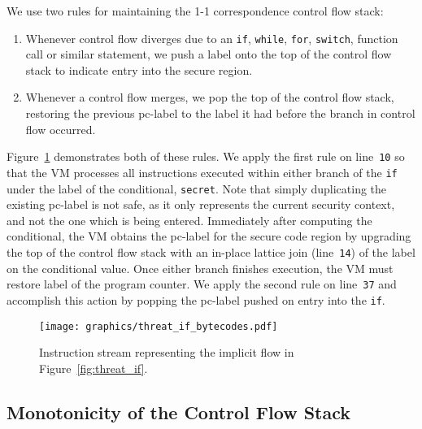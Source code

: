 \documentclass[preprint]{sigplanconf}
\begin{document}
We use two rules for maintaining the 1-1 correspondence control flow stack:
\begin{enumerate}
 \item Whenever control flow diverges due to an \texttt{if}, \texttt{while}, \texttt{for}, \texttt{switch}, function call or similar statement, we push a label onto the top of the control flow stack to indicate entry into the secure region.
 \item Whenever a control flow merges, we pop the top of the control flow stack, restoring the previous pc-label to the label it had before the branch in control flow occurred.
\end{enumerate}

Figure~\ref{fig:threat_if_bytecodes} demonstrates both of these rules.
We apply the first rule on line~\texttt{10} so that the VM processes all instructions executed within either branch of the \texttt{if} under the label of the conditional, \texttt{secret}.
Note that simply duplicating the existing pc-label is not safe, as it only represents the current security context, and not the one which is being entered.
Immediately after computing the conditional, the VM obtains the pc-label for the secure code region by upgrading the top of the control flow stack with an in-place lattice join (line~\texttt{14}) of the label on the conditional value.
Once either branch finishes execution, the VM must restore label of the program counter.
We apply the second rule on line~\texttt{37} and accomplish this action by popping the pc-label pushed on entry into the \texttt{if}.

\begin{figure}[ht]
  \centerline{\texttt{[image: graphics/threat\_if\_bytecodes.pdf]}}
  \caption{Instruction stream representing the implicit flow in Figure~\ref{fig:threat_if}.}
  \label{fig:threat_if_bytecodes}
\end{figure}

\subsection{Monotonicity of the Control Flow Stack}
\label{sec:monotonicity}
\end{document}
